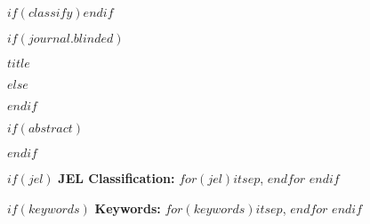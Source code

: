 \def\spacingset#1{\renewcommand{\baselinestretch}%
{#1}\small\normalsize} \spacingset{1}

$if(classify)$$endif$

$if(journal.blinded)$
  \spacingset{.8}
  \bigskip
  \bigskip
  \bigskip
  \begin{center}
    {\LARGE\textbf{$title$}}
  \end{center}
  \smallskip
  \bigskip
  \spacingset{1}
$else$
  \maketitle
$endif$

\bigskip

$if(abstract)$
\begin{abstract}
$abstract$
\end{abstract}
$endif$

$if(jel)$
\noindent\textbf{JEL Classification:} $for(jel)$$it$$sep$, $endfor$
$endif$

$if(keywords)$
\noindent\textbf{Keywords:} $for(keywords)$$it$$sep$, $endfor$
$endif$

\vfill
\clearpage

\spacingset{1.9} %
\parindent=20pt
\parskip=0pt

